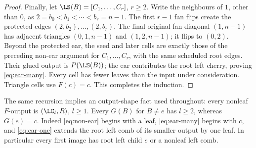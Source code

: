 \begin{proof}
Finally, let \(\LS(B)=[C_1,\ldots,C_r]\), \(r\ge2\). Write the neighbours
of \(1\), other than \(0\), as
\(2=b_0<b_1<\cdots<b_r=n-1\).
The first \(r-1\) fan flips create the protected edges
\((2,b_2),\ldots,(2,b_r)\). The final original fan diagonal \((1,n-1)\)
has adjacent triangles \((0,1,n-1)\) and \((1,2,n-1)\); it flips to
\((0,2)\). Beyond the protected ear, the seed and later cells are exactly
those of the preceding non-ear argument for \(C_1,\ldots,C_r\), with
the same scheduled root edges. Their glued output is \(P(\LS(B))\);
the ear contributes the root left cherry, proving \eqref{eq:ear-many}.
Every cell has fewer leaves than the input under consideration.
Triangle cells use \(F(c)=c\). This completes the induction.
\end{proof}

The same recursion implies an output-shape fact used throughout:
every nonleaf \(F\)-output is \((\LC_l,R)\), \(l\ge1\).
Every \(G(B)\) for \(B\ne e\) has \(l\ge2\), whereas \(G(e)=c\).
Indeed \eqref{eq:non-ear} begins with a leaf,
\eqref{eq:ear-many} begins with \(c\), and \eqref{eq:ear-one}
extends the root left comb of its smaller output by one leaf.
In particular every first image has root left child \(e\) or a nonleaf
left comb.
